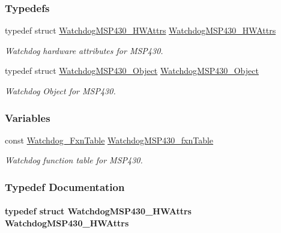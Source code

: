 \subsubsection*{Typedefs}
\begin{DoxyCompactItemize}
\item 
typedef struct \hyperlink{struct_watchdog_m_s_p430___h_w_attrs}{Watchdog\+M\+S\+P430\+\_\+\+H\+W\+Attrs} \hyperlink{_watchdog_m_s_p430_8h_af63bbbf564e9c87866b479a863d641b0}{Watchdog\+M\+S\+P430\+\_\+\+H\+W\+Attrs}
\begin{DoxyCompactList}\small\item\em Watchdog hardware attributes for M\+S\+P430. \end{DoxyCompactList}\item 
typedef struct \hyperlink{struct_watchdog_m_s_p430___object}{Watchdog\+M\+S\+P430\+\_\+\+Object} \hyperlink{_watchdog_m_s_p430_8h_a4a9f55d973176fc4959cd62a5e8a1871}{Watchdog\+M\+S\+P430\+\_\+\+Object}
\begin{DoxyCompactList}\small\item\em Watchdog Object for M\+S\+P430. \end{DoxyCompactList}\end{DoxyCompactItemize}
\subsubsection*{Variables}
\begin{DoxyCompactItemize}
\item 
const \hyperlink{struct_watchdog___fxn_table}{Watchdog\+\_\+\+Fxn\+Table} \hyperlink{_watchdog_m_s_p430_8h_ad70837d4fca74e7271df9b79a7dc3092}{Watchdog\+M\+S\+P430\+\_\+fxn\+Table}
\begin{DoxyCompactList}\small\item\em Watchdog function table for M\+S\+P430. \end{DoxyCompactList}\end{DoxyCompactItemize}


\subsubsection{Typedef Documentation}
\paragraph[{Watchdog\+M\+S\+P430\+\_\+\+H\+W\+Attrs}]{\setlength{\rightskip}{0pt plus 5cm}typedef struct {\bf Watchdog\+M\+S\+P430\+\_\+\+H\+W\+Attrs}  {\bf Watchdog\+M\+S\+P430\+\_\+\+H\+W\+Attrs}}\label{_watchdog_m_s_p430_8h_af63bbbf564e9c87866b479a863d641b0}


